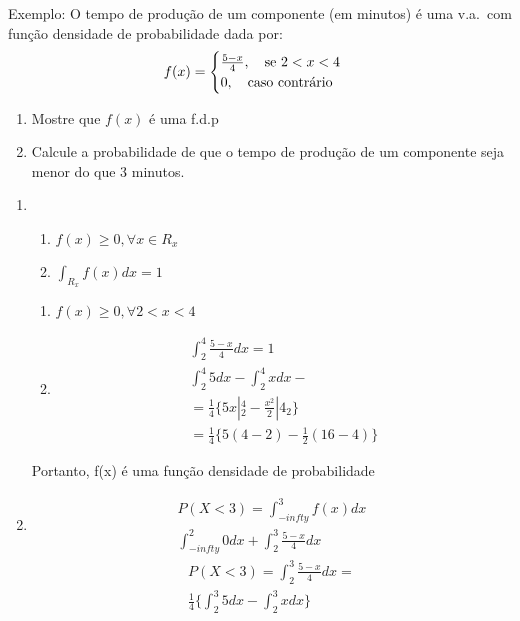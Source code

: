 \documentclass[11pt,a4paper]{book}
\begin{document}
\begin{enumerate}[label=(\alph*)]
\begin{enumerate}
\begin{enumerate}[label=(\alph*)]
\end{enumerate}
Exemplo: 
O tempo de produção de um componente (em minutos) é uma v.a.\ com função densidade 
de probabilidade dada por: 
\begin{align}
  f(x)=
  \begin{cases}
    \frac{5-x}{4}, \text{\quad se $2<x<4$}\\
    0,\text{\quad caso contrário} 
  \end{cases}
\end{align}
\begin{enumerate}[label=(\alph*)]
  \item Mostre que $f(x)$ é uma f.d.p
  \item Calcule a probabilidade de que o tempo de produção de um componente 
    seja menor do que 3 minutos.
\end{enumerate}
\begin{enumerate}[label=(\alph*)]
  \item 
    \begin{enumerate} %
      \item $f(x)\geq 0, \forall x \in R_{x}$
      \item $\int_{R_{x}} f(x)dx=1$
    \end{enumerate}
    \begin{enumerate} %
      \item $f(x)\geq 0, \forall 2<x<4$
      \item 
        \begin{align*}
          \int_{2}^4 \frac{5-x}{4}dx=1\\
          \int_{2}^4 5 dx - \int_{2}^4 x dx - \\
          = \frac{1}{4} \{5x|^4_2 - \frac{x^2}{2}|4_2 \}\\
          = \frac{1}{4} \{5(4-2)- \frac{1}{2}(16-4)\}
        \end{align*}
    \end{enumerate}
    Portanto, f(x) é uma função densidade de probabilidade 
  \item 
    \begin{align}
      P(X<3)= \int_{-infty}^{3} f(x)dx \\
      \int_{-infty}^{2}0 dx +      \int_{2}^{3} \frac{5-x}{4} dx 
    \end{align}
    \begin{align}
      P(X<3)=\int_{2}^{3} \frac{5-x}{4} dx =\\
      \frac{1}{4}\{ \int_{2}^{3} 5 dx - \int_{2}^{3} x dx \}\\

\end{align}
\end{enumerate}
\end{enumerate}
\end{enumerate}
\end{document}
